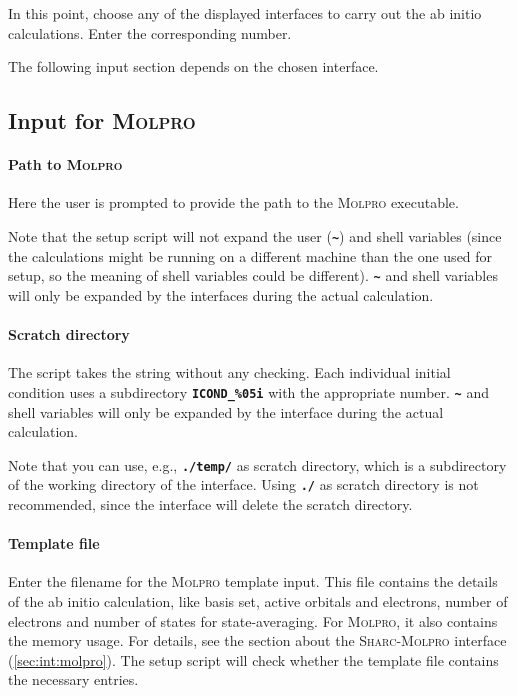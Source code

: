 \documentclass[a4paper,11pt,DIV=15,openany,twoside=false]{scrbook}
\newcommand{\sharc}{\textsc{Sharc}}
\newcommand{\ttt}[1]{\textbf{\texttt{#1}}}
\begin{document}
In this point, choose any of the displayed interfaces to carry out the ab initio calculations. Enter the corresponding number. 

The following input section depends on the chosen interface.

\subsection{Input for \textsc{Molpro}}\label{sec:setup_init.py:molpro}

\paragraph{Path to \textsc{Molpro}}

Here the user is prompted to provide the path to the \textsc{Molpro} executable. 

Note that the setup script will not expand the user (\ttt{\textasciitilde}) and shell variables (since the calculations might be running on a different machine than the one used for setup, so the meaning of shell variables could be different). \ttt{\textasciitilde} and shell variables will only be expanded by the interfaces during the actual calculation.

\paragraph{Scratch directory}

The script takes the string without any checking. Each individual initial condition uses a subdirectory \ttt{ICOND\_\%05i} with the appropriate number. \ttt{\textasciitilde} and shell variables will only be expanded by the interface during the actual calculation.

Note that you can use, e.g., \ttt{./temp/} as scratch directory, which is a subdirectory of the working directory of the interface. Using \ttt{./} as scratch directory is not recommended, since the interface will delete the scratch directory.

\paragraph{Template file}

Enter the filename for the \textsc{Molpro} template input. This file contains the details of the ab initio calculation, like basis set, active orbitals and electrons, number of electrons and number of states for state-averaging. For \textsc{Molpro}, it also contains the memory usage. For details, see the section about the \sharc-\textsc{Molpro} interface (\ref{sec:int:molpro}). The setup script will check whether the template file contains the necessary entries. 
\end{document}
